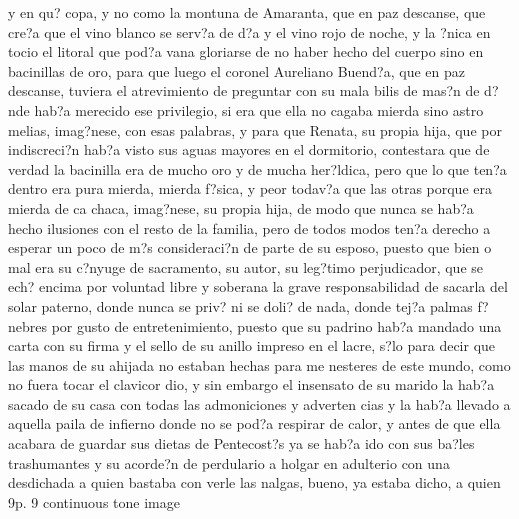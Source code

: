 y en qu? copa, y no como la montuna de Amaranta, que en paz descanse, que cre?a que el vino blanco se serv?a de d?a y el vino rojo de noche, y la ?nica en tocio el litoral que pod?a vana gloriarse de no haber hecho del cuerpo sino en bacinillas de oro, para que luego el coronel Aureliano Buend?a, que en paz descanse, tuviera el atrevimiento de preguntar con su mala bilis de mas?n de d?nde hab?a merecido ese privilegio, si era que ella no cagaba mierda sino astro melias, imag?nese, con esas palabras, y para que Renata, su propia hija, que por indiscreci?n hab?a visto sus aguas mayores en el dormitorio, contestara que de verdad la bacinilla era de mucho oro y de mucha her?ldica, pero que lo que ten?a dentro era pura mierda, mierda f?sica, y peor todav?a que las otras porque era mierda de ca chaca, imag?nese, su propia hija, de modo que nunca se hab?a hecho ilusiones con el resto de la familia, pero de todos modos ten?a derecho a esperar un poco de m?s consideraci?n de parte de su esposo, puesto que bien o mal era su c?nyuge de sacramento, su autor, su leg?timo perjudicador, que se ech? encima por voluntad libre y soberana la grave responsabilidad de sacarla del solar paterno, donde nunca se priv? ni se doli? de nada, donde tej?a palmas f?nebres por gusto de entretenimiento, puesto que su padrino hab?a mandado una carta con su firma y el sello de su anillo impreso en el lacre, s?lo para decir que las manos de su ahijada no estaban hechas para me nesteres de este mundo, como no fuera tocar el clavicor dio, y sin embargo el insensato de su marido la hab?a sacado de su casa con todas las admoniciones y adverten cias y la hab?a llevado a aquella paila de infierno donde no se pod?a respirar de calor, y antes de que ella acabara de guardar sus dietas de Pentecost?s ya se hab?a ido con sus ba?les trashumantes y su acorde?n de perdulario a holgar en adulterio con una desdichada a quien bastaba con verle las nalgas, bueno, ya estaba dicho, a quien 9p. 9
continuous tone image

